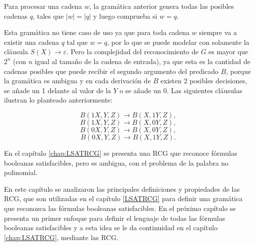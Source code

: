 Para procesar una cadena $w$, la gramática anterior genera todas las posibles cadenas $q$, tales que $|w|=|q|$ y luego comprueba si $w = q$.

Esta gramática no tiene caso de uso ya que para toda cadena $w$ siempre va a existir una cadena $q$ tal que $w=q$, 
por lo que se puede modelar con solamente la cláusula $S(X)\to \varepsilon$. Pero la complejidad del 
reconocimiento de $G$ es mayor que $2^n$ (con $n$ igual al tamaño de la cadena de entrada), ya que esta es la 
cantidad de cadenas posibles que puede recibir el segundo argumento del predicado $B$, porque la gramática es 
ambigua y en cada derivación de $B$ existen 2 posibles decisiones, se añade un 1 delante al valor de la $Y$ o 
se añade un $0$. Las siguientes cláusulas ilustran lo planteado anteriormente:

$$B(1X,Y,Z)\to B(X,1Y,Z),$$
$$B(1X,Y,Z)\to B(X,0Y,Z),$$
$$B(0X,Y,Z)\to B(X,0Y,Z),$$
$$B(0X,Y,Z)\to B(X,1Y,Z).$$

En el capítulo \ref{chap:LSATRCG} se presenta una RCG que reconoce fórmulas booleanas satisfacibles,
pero es ambigua, con el problema de la palabra no polinomial.

En este capítulo se analizaron las principales definiciones y propiedades de las RCG, que son utilizadas en el capítulo \ref{LSATRCG} para definir una gramática que reconozca las fórmulas booleanas satisfacibles.  En el próximo capítulo se presenta un primer enfoque para definir el lenguaje de todas las fórmulas booleanas satisfacibles y a esta idea se le da continuidad en el capítulo \ref{chap:LSATRCG}, mediante las RCG.